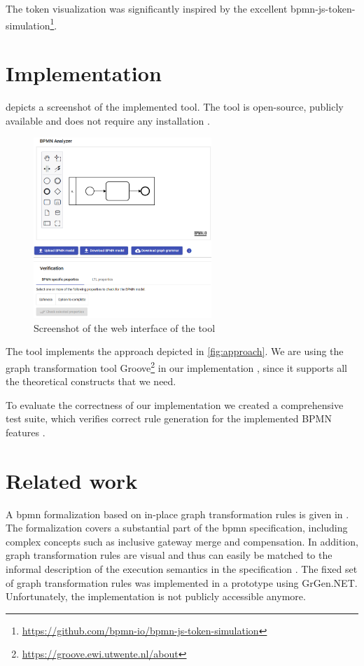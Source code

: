 \documentclass[adraft, copyright, creativecommons]{eptcs} %
\begin{document}
The token visualization was significantly inspired by the excellent bpmn-js-token-simulation\footnote{\url{https://github.com/bpmn-io/bpmn-js-token-simulation}}.
\section{Implementation} \label{sec:impl}
 depicts a screenshot of the implemented tool.
The tool is open-source, publicly available and does not require any installation \cite{ArtifactsTERMGRAPH2022}.

\begin{figure}[h]
    \centering
    \includegraphics[width=0.6\textwidth]{images/impl.png}
    \caption{Screenshot of the web interface of the tool}
    \label{fig:implScreenshot}
\end{figure}

The tool implements the approach depicted in \cref{fig:approach}.
We are using the graph transformation tool Groove\footnote{\url{https://groove.ewi.utwente.nl/about}} in our implementation \cite{ghamarianModellingAnalysisUsing2012, rensinkGROOVESimulatorTool2004}, since it supports all the theoretical constructs that we need.

To evaluate the correctness of our implementation we created a comprehensive test suite, which verifies correct rule generation for the implemented BPMN features \cite{ArtifactsTERMGRAPH2022}.
\section{Related work} \label{sec:relatedWork}
A \gls*{bpmn} formalization based on in-place graph transformation rules is given in \cite{vangorpVisualTokenbasedFormalization2013}.
The formalization covers a substantial part of the \gls*{bpmn} specification, including complex concepts such as inclusive gateway merge and compensation.
In addition, graph transformation rules are visual and thus can easily be matched to the informal description of the execution semantics in the specification \cite{objectmanagementgroupBusinessProcessModel2013}.
The fixed set of graph transformation rules was implemented in a prototype using GrGen.NET.
Unfortunately, the implementation is not publicly accessible anymore.
\end{document}
